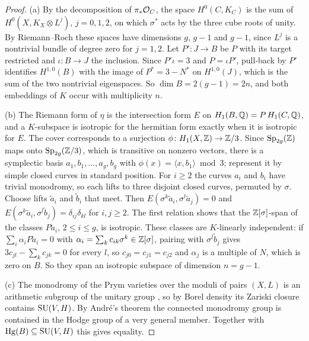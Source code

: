 \begin{proof}
(a) By the decomposition of $\pi_{*}\mathcal{O}_{C}$, the space $H^{0}(C,K_{C})$ is
the sum of $H^{0}(X,K_{X}\otimes L^{j})$, $j=0,1,2$, on which $\sigma^{*}$
acts by the three cube roots of unity. By Riemann--Roch these spaces have
dimensions $g$, $g-1$ and $g-1$, since $L^{j}$ is a nontrivial bundle of
degree zero for $j=1,2$. Let $P'\colon J\to B$ be $P$ with its target
restricted and $\iota\colon B\to J$ the inclusion. Since $P'\iota=3$ and
$P=\iota P'$, pull-back by $P'$ identifies $H^{1,0}(B)$ with the image of
$P^{*}=3-N^{*}$ on $H^{1,0}(J)$, which is the sum of the two nontrivial
eigenspaces. So $\dim B=2(g-1)=2n$, and both embeddings of $K$ occur with
multiplicity $n$.

(b) The Riemann form of $\eta$ is the intersection form $E$ on
$H_{1}(B,\mathbb{Q})=P\,H_{1}(C,\mathbb{Q})$, and a $K$-subspace is isotropic for the
hermitian form exactly when it is isotropic for $E$. The cover corresponds to
a surjection $\phi\colon H_{1}(X,\mathbb{Z})\to\mathbb{Z}/3$. Since $\mathrm{Sp}_{2g}(\mathbb{Z})$
maps onto $\mathrm{Sp}_{2g}(\mathbb{Z}/3)$, which is transitive on nonzero vectors,
there is a symplectic basis $a_{1},b_{1},\dots,a_{g},b_{g}$ with
$\phi(x)=\langle x,b_{1}\rangle\bmod 3$; represent it by simple closed
curves in standard position. For $i\ge2$ the curves $a_{i}$ and $b_{i}$ have
trivial monodromy, so each lifts to three disjoint closed curves, permuted by
$\sigma$. Choose lifts $\tilde a_{i}$ and $\tilde b_{i}$ that meet. Then
$E(\sigma^{k}\tilde a_{i},\sigma^{l}\tilde a_{j})=0$ and
$E(\sigma^{k}\tilde a_{i},\sigma^{l}\tilde b_{j})=\delta_{ij}\delta_{kl}$
for $i,j\ge2$. The first relation shows that the $\mathbb{Z}[\sigma]$-span of the
classes $P\tilde a_{i}$, $2\le i\le g$, is isotropic. These classes are
$K$-linearly independent: if $\sum_{i}\alpha_{i}P\tilde a_{i}=0$ with
$\alpha_{i}=\sum_{k}c_{ik}\sigma^{k}\in\mathbb{Z}[\sigma]$, pairing with
$\sigma^{l}\tilde b_{j}$ gives $3c_{jl}-\sum_{k}c_{jk}=0$ for every $l$, so
$c_{j0}=c_{j1}=c_{j2}$ and $\alpha_{j}$ is a multiple of $N$, which is zero
on $B$. So they span an isotropic subspace of dimension $n=g-1$.

(c) The monodromy of the Prym varieties over the moduli of pairs $(X,L)$ is
an arithmetic subgroup of the unitary group \cite{Loo97}, so by Borel density its Zariski closure contains
$\operatorname{SU}(V,H)$. By Andr\'e's theorem \cite{And92} the connected
monodromy group is contained in the Hodge group of a very general member.
Together with $\operatorname{Hg}(B)\subseteq\operatorname{SU}(V,H)$ this gives equality.
\end{proof}

